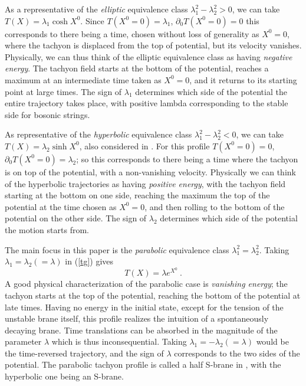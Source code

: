 \documentclass[a4paper,12pt]{article}
\begin{document}
As a representative of the {\it elliptic} equivalence class $\lambda_1^2-\lambda_2^2 >0$, 
we can take $T(X)=\lambda_1 \cosh X^0$. Since 
$T(X^0=0)=\lambda_1$, $\partial_0 T(X^0=0)= 0$ this corresponds to there being
a time, chosen without loss of generality as $X^0=0$, where the tachyon is displaced 
from the top of potential, but its velocity vanishes. Physically, we can thus think of the
elliptic equivalence class as having {\it negative energy}. The tachyon field starts
at the bottom of the potential, reaches a maximum at an intermediate time taken as $X^0=0$, 
and it returns to its starting point at large times.  The sign of $\lambda_1$ 
determines  which side of the potential the entire trajectory takes place, with 
positive lambda corresponding to the stable side for bosonic strings. 

As representative of the {\it hyperbolic} equivalence class $\lambda_1^2-\lambda_2^2 <0$, 
we can take $T(X)=\lambda_2 \sinh X^0$, also considered in \cite{Sen1}. For this 
profile $T(X^0=0)=0$, $\partial_0 T(X^0=0)= \lambda_2$; so this corresponds to 
there being a time where the tachyon is on top of the potential, with a non-vanishing
velocity.  Physically we can think of the hyperbolic trajectories as having {\it positive
energy}, with the tachyon field starting at the bottom on one side, reaching
the maximum the top of the potential at the time chosen as $X^0=0$, and then
rolling to the bottom of the potential on the other side. The sign of $\lambda_2$
determines which side of the potential the motion starts from.

The main focus in this paper is the {\it parabolic} equivalence class
$\lambda_1^2=\lambda_2^2$.  Taking $\lambda_1= \lambda_2(=\lambda)$ in
(\ref{tg}) gives
\begin{equation}
T(X)= \lambda e^{X^0}~.
\label{tg3}
\label{tachprof}
\end{equation}
A good physical characterization of the parabolic case is 
{\it vanishing energy}; the tachyon starts at the top of the potential, reaching 
the bottom of the potential at late times. Having no energy in the
initial state, except for the tension of the unstable brane itself, this profile 
realizes the intuition of a spontaneously decaying brane. 
Time translations can be absorbed in the magnitude of the parameter 
$\lambda$ which is thus inconsequential. Taking $\lambda_1= -\lambda_2(=\lambda)$ 
would be the time-reversed trajectory, and the sign of $\lambda$ corresponds
to the two sides of the potential.
The parabolic tachyon profile is called a half S-brane in \cite{Strominger:2002pc}, 
with the hyperbolic one being an S-brane.
\end{document}
